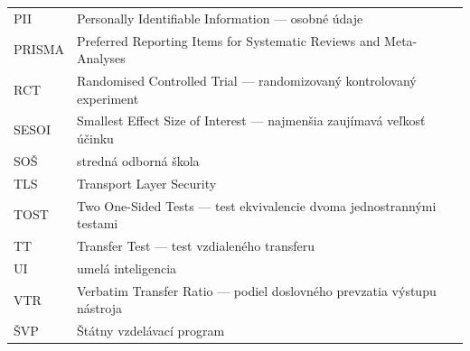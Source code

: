 \begin{tabular}{@{}p{2.1cm}p{10.9cm}@{}}
    PII     & Personally Identifiable Information --- osobné údaje \\
    PRISMA  & Preferred Reporting Items for Systematic Reviews and Meta-Analyses \\
    RCT     & Randomised Controlled Trial --- randomizovaný kontrolovaný experiment \\
    SESOI   & Smallest Effect Size of Interest --- najmenšia zaujímavá veľkosť účinku \\
    SOŠ     & stredná odborná škola \\
    TLS     & Transport Layer Security \\
    TOST    & Two One-Sided Tests --- test ekvivalencie dvoma jednostrannými testami \\
    TT      & Transfer Test --- test vzdialeného transferu \\
    UI      & umelá inteligencia \\
    VTR     & Verbatim Transfer Ratio --- podiel doslovného prevzatia výstupu nástroja \\
    ŠVP     & Štátny vzdelávací program \\
\end{tabular}
\egroup
